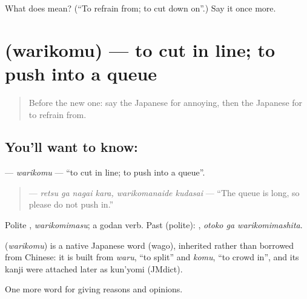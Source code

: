 \begin{tcolorbox}[breakable,colback=teal!4,colframe=teal!35!black,title={Before you move on}]
What does  mean? (\textquotedblleft{}To refrain from; to cut down on\textquotedblright{}.) Say it once more.
\end{tcolorbox}
\section[\texorpdfstring{\ja{わりこむ} (warikomu)}{わりこむ (warikomu)}]{ (warikomu) — to cut in line; to push into a queue}

\label{lesson:JA-C328-warikomu}



\begin{quote}
Before the new one: say the Japanese for annoying, then the Japanese for to refrain from.
\end{quote}

\subsection*{You'll want to know: }
\textbf{} — \emph{warikomu} — \textquotedblleft{}to cut in line; to push into a queue\textquotedblright{}.

\begin{quote}
\textbf{  } — \emph{retsu ga nagai kara, warikomanaide kudasai} — \textquotedblleft{}The queue is long, so please do not push in.\textquotedblright{}
\end{quote}

Polite \textbf{}, \emph{warikomimasu}; a godan verb. Past (polite): \textbf{ }, \emph{otoko ga warikomimashita}.

\begin{cousinweb}
\textbf{} (\emph{warikomu}) is a native Japanese word (wago), inherited rather than borrowed from Chinese: it is built from \emph{waru}, \textquotedblleft{}to split\textquotedblright{} and \emph{komu}, \textquotedblleft{}to crowd in\textquotedblright{}, and its kanji were attached later as kun'yomi (JMdict).
\end{cousinweb}

\begin{grammarlens}[title={What you've built}]
One more word for giving reasons and opinions.
\end{grammarlens}

